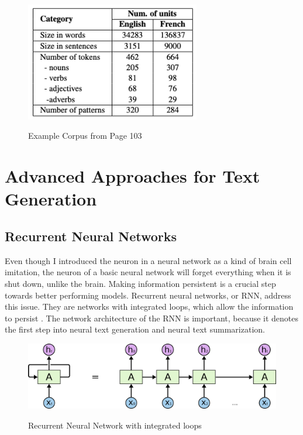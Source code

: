 \begin{figure}
	\begin{center}
		\includegraphics[width=3in]{photos/corpus}\\
		\caption{Example Corpus from \cite{elena} Page 103}\label{corpus}
	\end{center}
\end{figure}

\section{Advanced Approaches for Text Generation}
\subsection{Recurrent Neural Networks}
Even though I introduced the neuron in a neural network as a kind of brain cell imitation, the neuron of a basic neural network will forget everything when it is shut down, unlike the brain. Making information persistent is a crucial step towards better performing models. Recurrent neural networks, or RNN, address this issue. They are networks with integrated loops, which allow the information to persist \cite{olah}. The network architecture of the RNN is important, because it denotes the first step into neural text generation and neural text summarization. 

\begin{figure}
	\begin{center}
		\includegraphics[width=4.5in]{photos/RNN-unrolled}\\
		\caption{Recurrent Neural Network with integrated loops \cite{olah}}\label{rnn}
	\end{center}
\end{figure}

